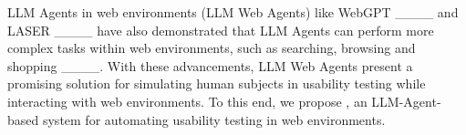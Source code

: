 LLM Agents in web environments (LLM Web Agents) like WebGPT ____ and LASER ____ have also demonstrated that LLM Agents can perform more complex tasks within web environments, such as searching, browsing and shopping ____.
With these advancements, LLM Web Agents present a promising solution for simulating human subjects in usability testing while interacting with web environments.
To this end, we propose \projectname, an LLM-Agent-based system for automating usability testing in web environments.